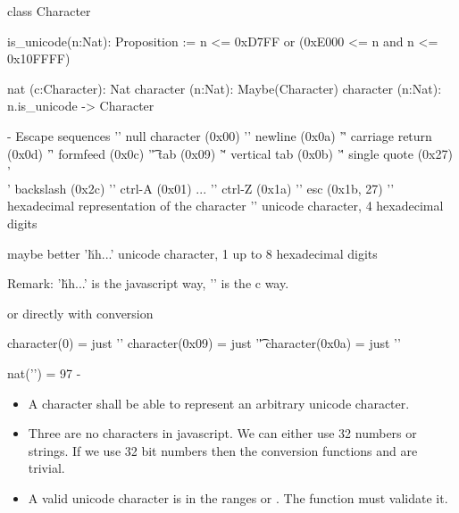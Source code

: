 \begin{alba}
  class Character

  is_unicode(n:Nat): Proposition :=
    n <= 0xD7FF or (0xE000 <= n and n <= 0x10FFFF)

  nat (c:Character): Nat
  character (n:Nat): Maybe(Character)
  character (n:Nat): n.is_unicode -> Character

  {- Escape sequences
    '\0'          null character (0x00)
    '\n'          newline (0x0a)
    '\r'          carriage return (0x0d)
    '\f'          formfeed (0x0c)
    '\t'          tab (0x09)
    '\v'          vertical tab (0x0b)
    '\''          single quote (0x27)
    '\\'          backslash (0x2c)
    '\cA'         ctrl-A (0x01)
    ...
    '\cZ'         ctrl-Z (0x1a)
    '\e'          esc (0x1b, 27)
    '\xhh'        hexadecimal representation of the character
    '\uhhhh'      unicode character, 4 hexadecimal digits

    maybe better
    '\u{hh...}'   unicode character, 1 up to 8 hexadecimal digits

    Remark: '\u{hh...}' is the javascript way, '\Uhhhhhhhh' is the c way.


    or directly with conversion

    character(0)  =   just '\0'
    character(0x09) = just '\t'
    character(0x0a) = just '\n'

    nat('\a')  = 97
  -}
\end{alba}


\begin{itemize}

\item A character shall be able to represent an arbitrary unicode character.

\item Three are no characters in javascript. We can either use 32 numbers or
  strings. If we use 32 bit numbers then the conversion functions
   and  are trivial.

\item A valid unicode character is in the ranges  or
  . The function  must validate it.
\end{itemize}











\vskip 5mm

